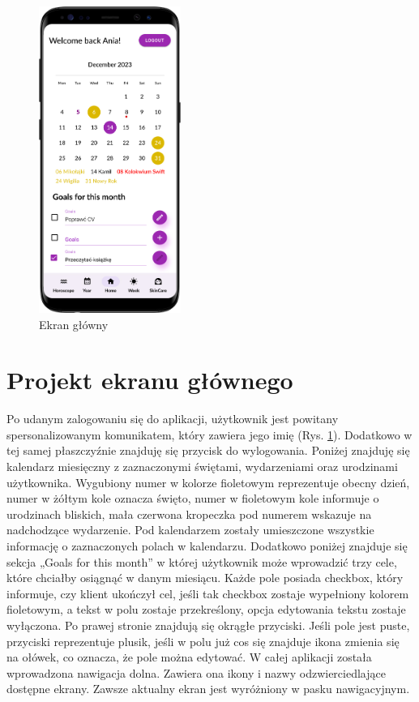 \begin{figure}[t]
	\begin{center}
		\begin{minipage}{0.4\textwidth}
			\centering
			\includegraphics[height=10cm, keepaspectratio]{images/interfejs_figma/Home}
			\caption{Ekran główny}
			\label{fig:Home}
		\end{minipage}
	\end{center}
\end{figure}

\section*{Projekt ekranu głównego}
Po udanym zalogowaniu się do aplikacji, użytkownik jest powitany spersonalizowanym komunikatem, który zawiera jego imię (Rys. \ref{fig:Home}). Dodatkowo w tej samej płaszczyźnie znajduję się przycisk do wylogowania. Poniżej znajduję się kalendarz miesięczny z zaznaczonymi świętami, wydarzeniami oraz urodzinami użytkownika. Wygubiony numer w kolorze fioletowym reprezentuje obecny dzień, numer w żółtym kole oznacza święto, numer w fioletowym kole informuje o urodzinach bliskich, mała czerwona kropeczka pod numerem wskazuje na nadchodzące wydarzenie. Pod kalendarzem zostały umieszczone wszystkie informację o zaznaczonych polach w kalendarzu. Dodatkowo poniżej znajduje się sekcja „Goals for this month” w której użytkownik może wprowadzić trzy cele, które chciałby osiągnąć w danym miesiącu. Każde pole posiada checkbox, który informuje, czy klient ukończył cel, jeśli tak checkbox zostaje wypełniony kolorem fioletowym, a tekst w polu zostaje przekreślony, opcja edytowania tekstu zostaje wyłączona. Po prawej stronie znajdują się okrągłe przyciski. Jeśli pole jest puste, przyciski reprezentuje plusik, jeśli w polu już cos się znajduje ikona zmienia się na ołówek, co oznacza, że pole można edytować. W całej aplikacji została wprowadzona nawigacja dolna. Zawiera ona ikony i nazwy odzwierciedlające dostępne ekrany. Zawsze aktualny ekran jest wyróżniony w pasku nawigacyjnym.

